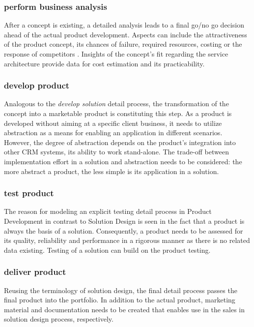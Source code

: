 	\subsubsection{perform business analysis}
	After a concept is existing, a detailed analysis leads to a final go/no go decision ahead of the actual product development. Aspects can include the attractiveness of the product concept, its chances of failure, required resources, costing or the response of competitors \citep[]{cowell1988_new}. Insights of the concept's fit regarding the service architecture provide data for cost estimation and its practicability. 

	\subsubsection{develop product}
	Analogous to the \textit{develop solution} detail process, the transformation of the concept into a marketable product is constituting this step. As a product is developed without aiming at a specific client business, it needs to utilize abstraction as a means for enabling an application in different scenarios. However, the degree of abstraction depends on the product's integration into other \acrshort{CRM} systems, \ie its ability to work stand-alone. The trade-off between implementation effort in a solution and abstraction needs to be considered: the more abstract a product, the less simple is its application in a solution. 
	
	\subsubsection{test product}
	The reason for modeling an explicit testing detail process in Product Development in contrast to Solution Design is seen in the fact that a product is always the basis of a solution. Consequently, a product needs to be assessed for its quality, reliability and performance in a rigorous manner as there is no related data existing. Testing of a solution can build on the product testing.

	\subsubsection{deliver product}
	Reusing the terminology of solution design, the final detail process passes the final product into the portfolio. In addition to the actual product, marketing material and documentation needs to be created that enables use in the sales in solution design process, respectively. 
	
